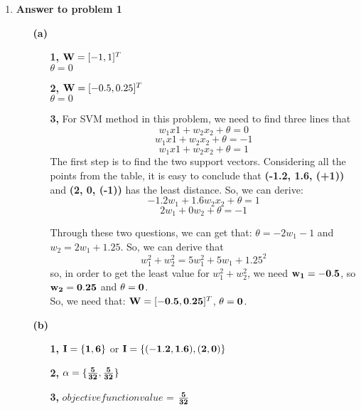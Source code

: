 

\usepackage{graphicx,amssymb,amsmath, listings}
\usepackage{float}
\lstset{language = Matlab}
\lstset{breaklines}
\lstset{extendedchars=false}

\oddsidemargin 0in
\evensidemargin 0in
\textwidth 6.5in
\topmargin -0.5in
\textheight 9.0in



\pagestyle{myheadings}  %

\begin{enumerate}
\item {\bf Answer to problem 1}
\begin{enumerate}
\item[{\bf (a)}]
\begin{enumerate}
\item[{\bf 1, }]
${\bf W} = [-1, 1]^T$ \\
$\theta = 0$\\

\item[{\bf 2, }]
${\bf W} = [-0.5, 0.25]^T$ \\
$\theta = 0$\\

\item[{\bf 3, }]
For SVM method in this problem, we need to find three lines that $$w_1x1 + w_2x_2 + \theta = 0$$
$$w_1x1 + w_2x_2 + \theta = -1$$
$$w_1x1 + w_2x_2 + \theta = 1$$
The first step is to find the two support vectors. Considering all the points from the table, it is easy to conclude that {\bf (-1.2, 1.6, (+1))} and {\bf (2, 0, (-1))} has the least distance. So, we can derive:
$$-1.2w_1 + 1.6w_2x_2 + \theta = 1$$
$$2w_1 + 0w_2 + \theta = -1$$

Through these two questions, we can get that: $\theta = -2w_1-1$ and $w_2 = 2w_1+1.25$.
So, we can derive that $$w_1^2 + w_2^2 = 5w_1^2 + 5w_1 + 1.25^2$$
so, in order to get the least value for $w_1^2 + w_2^2$, we need ${\bf w_1 = -0.5}$, so ${\bf w_2 = 0.25}$ and ${\bf \theta = 0}$.\\

So, we need that: ${\bf W} = [{\bf -0.5, 0.25}]^T$, \qquad ${\bf \theta = 0}$.\\
\end{enumerate}

\item[{\bf (b)}]
\begin{enumerate}
\item[{\bf 1, }]
$\bf I = \{1, 6\}$ or $\bf I = \{(-1.2, 1.6), (2, 0)\}$\\
\item[{\bf 2, }]
${\bf \alpha = \{\frac{5}{32},  \frac{5}{32}\}}$\\
\item[{\bf 3, }]
$objective function value$ = ${\bf \frac{5}{32}}$\\
\end{enumerate}


\end{enumerate}
\end{enumerate}
